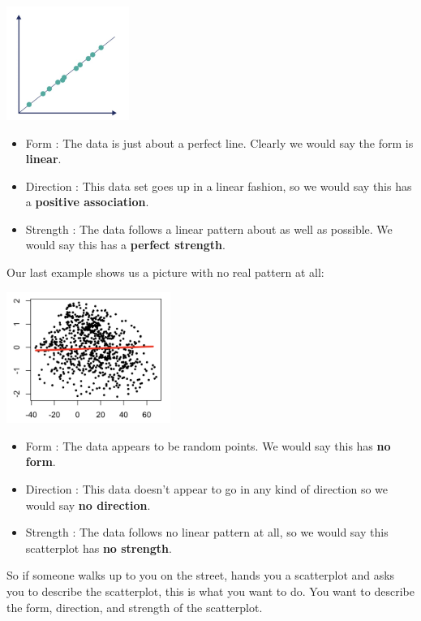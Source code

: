 \documentclass[
  letterpaper,
  DIV=11,
  numbers=noendperiod]{scrreprt}
\providecommand{\tightlist}{%
  \setlength{\itemsep}{0pt}\setlength{\parskip}{0pt}}\usepackage{longtable,booktabs,array}
\begin{document}
\includegraphics[width=0.3\textwidth,height=\textheight]{./images/SC_5.jpg}

\begin{itemize}
\tightlist
\item
  Form : The data is just about a perfect line. Clearly we would say the
  form is \textbf{linear}.
\item
  Direction : This data set goes up in a linear fashion, so we would say
  this has a \textbf{positive association}.
\item
  Strength : The data follows a linear pattern about as well as
  possible. We would say this has a \textbf{perfect strength}.
\end{itemize}

Our last example shows us a picture with no real pattern at all:

\includegraphics[width=0.4\textwidth,height=\textheight]{./images/SC_6.jpg}

\begin{itemize}
\tightlist
\item
  Form : The data appears to be random points. We would say this has
  \textbf{no form}.
\item
  Direction : This data doesn't appear to go in any kind of direction so
  we would say \textbf{no direction}.
\item
  Strength : The data follows no linear pattern at all, so we would say
  this scatterplot has \textbf{no strength}.
\end{itemize}

So if someone walks up to you on the street, hands you a scatterplot and
asks you to describe the scatterplot, this is what you want to do. You
want to describe the form, direction, and strength of the scatterplot.
\end{document}
